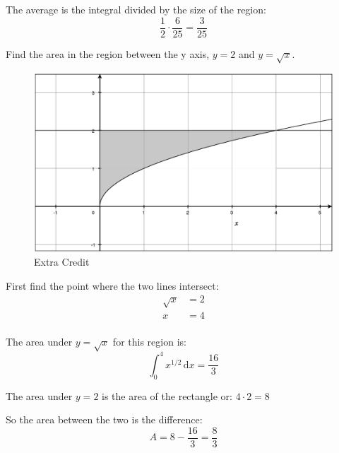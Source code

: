 \documentclass[fleqn,addpoints]{exam}
\begin{document}
\begin{questions}
\begin{solution}[5 cm]
The average is the integral divided by the size of the region:
\[
  \frac{1}{2} \cdot \frac{6}{25} = \frac{3}{25}
\]

\end{solution}

\ifprintanswers
\else
\pagebreak
\fi


\bonusquestion[10]

Find the area in the region between the y axis, $y = 2$ and $y = \sqrt{x}$.

\ifprintanswers
\pagebreak
\fi

\begin{solution}[10 cm]

\begin{figure}[H]
  \centering
  \includegraphics[scale=.3]{extra_credit.eps}
  \caption*{Extra Credit}
\end{figure}

First find the point where the two lines intersect:
\begin{align*}
  \sqrt{x} &= 2 \\
  x &= 4 \\
\end{align*}

The area under $y = \sqrt{x}$ for this region is:
\[
  \int_0^4 x^{1/2} \, \mathrm{d}x = \frac{16}{3}
\]

The area under $y = 2$ is the area of the rectangle or: $4 \cdot 2 = 8$

So the area between the two is the difference:
\[
  A = 8 - \frac{16}{3} = \frac{8}{3}
\]
\end{solution}



\end{questions}
\end{document}
